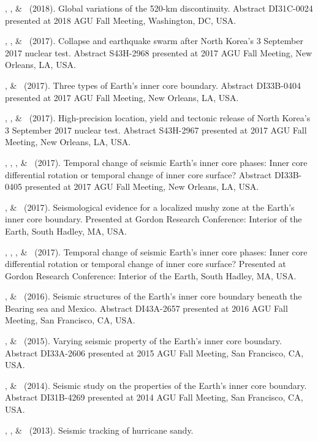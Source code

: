 \begin{etaremune}
\item
    \Me, \SWei, \& \PShearer\ (2018).
    Global variations of the 520-km discontinuity.
    Abstract DI31C-0024 presented at 2018 AGU Fall Meeting, Washington, DC, USA.
\item
    \Me, \JYao, \& \LWen\ (2017).
    Collapse and earthquake swarm after North Korea's 3 September 2017 nuclear test.
    Abstract S43H-2968 presented at 2017 AGU Fall Meeting, New Orleans, LA, USA.
\item
    \Me, \& \LWen\ (2017).
    Three types of Earth's inner core boundary.
    Abstract DI33B-0404 presented at 2017 AGU Fall Meeting, New Orleans, LA, USA.
\item
    \JYao, \Me, \& \LWen\ (2017).
    High-precision location, yield and tectonic release of North Korea's 3 September 2017 nuclear test.
    Abstract S43H-2967 presented at 2017 AGU Fall Meeting, New Orleans, LA, USA.
\item
    \JYao, \Me, \LSun, \& \LWen\ (2017).
    Temporal change of seismic Earth's inner core phases: Inner core differential rotation or temporal change of inner core surface?
    Abstract DI33B-0405 presented at 2017 AGU Fall Meeting, New Orleans, LA, USA.
\item
    \Me, \& \LWen\ (2017).
    Seismological evidence for a localized mushy zone at the Earth's inner core boundary.
    Presented at Gordon Research Conference: Interior of the Earth, South Hadley, MA, USA.
\item
    \JYao, \Me, \LSun, \& \LWen\ (2017).
    Temporal change of seismic Earth's inner core phases: Inner core differential rotation or temporal change of inner core surface?
    Presented at Gordon Research Conference: Interior of the Earth, South Hadley, MA, USA.
\item
    \Me, \& \LWen\ (2016).
    Seismic structures of the Earth's inner core boundary beneath the Bearing sea and Mexico.
    Abstract DI43A-2657 presented at 2016 AGU Fall Meeting, San Francisco, CA, USA.
\item
    \Me, \& \LWen\ (2015).
    Varying seismic property of the Earth's inner core boundary.
    Abstract DI33A-2606 presented at 2015 AGU Fall Meeting, San Francisco, CA, USA.
\item
    \Me, \& \LWen\ (2014).
    Seismic study on the properties of the Earth's inner core boundary.
    Abstract DI31B-4269 presented at 2014 AGU Fall Meeting, San Francisco, CA, USA.
\item
    \XChen, \Me, \& \LWen\ (2013).
    Seismic tracking of hurricane sandy.

\end{etaremune}
